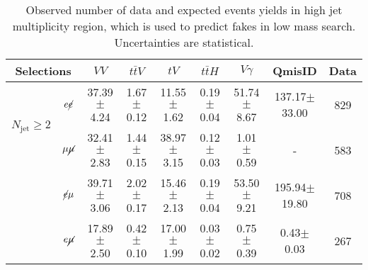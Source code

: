 \begin{table}[!ht]
\begin{center}
\small
\begin{tabular}{c|c|cccc|c|c|c}
\hline
\hline
\multicolumn{2}{c|}{ Selections}                      &$VV$  &$t\bar{t}V$    &$tV$    &$t\bar{t}H$     &$V\gamma$  &QmisID  &Data \\
\hline
\multirow{2}{*}{$N_{\text{jet}} \geq 2$}  &$e\cancel{e}$ &37.39$\pm$4.24  &1.67 $\pm$ 0.12  &11.55 $\pm$ 1.62  &0.19 $\pm$ 0.04  &51.74 $\pm$ 8.67  &137.17$\pm$33.00  &829 \\ 
\cline{2-9}
                                       &$\mu\cancel{\mu}$ &32.41$\pm$2.83    &1.44$\pm$0.15    &38.97$\pm$3.15    &0.12$\pm$0.03    &1.01$\pm$0.59    &-    &583 \\ 
\cline{2-9}
                                       &$\cancel{e}\mu$ &39.71$\pm$3.06  &2.02 $\pm$ 0.17  &15.46 $\pm$ 2.13  &0.19 $\pm$ 0.04  &53.50 $\pm$ 9.21  &195.94$\pm$19.80  &708 \\ 
\cline{2-9}
                                       &$e\cancel{\mu}$ &17.89$\pm$2.50  &0.42 $\pm$ 0.10  &17.00 $\pm$ 1.99  &0.03 $\pm$ 0.02  &0.75 $\pm$ 0.39  &0.43$\pm$0.03  &267 \\ 
\hline
\hline
\end{tabular}
\caption{Observed number of data and expected events yields in high jet multiplicity region, which is used to predict fakes in low mass search. Uncertainties are statistical.}
\label{tab:low_Njet_CR_eventyield}
\end{center}
\end{table}
